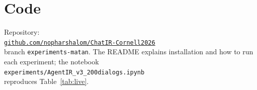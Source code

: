 \documentclass[sigconf,nonacm]{acmart}
\begin{document}
\section*{Code}
Repository:\\\href{https://github.com/nopharshalom/ChatIR-Cornell2026}{\texttt{github.com/nopharshalom/ChatIR-Cornell2026}}\\ branch
\texttt{experiments-matan}. The README explains installation and how to run each experiment;
the notebook\\\texttt{experiments/AgentIR\_v3\_200dialogs.ipynb}\\reproduces Table~\ref{tab:live}.



\end{document}

